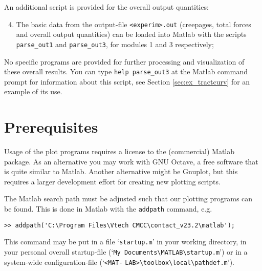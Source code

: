 \documentclass[12pt]{report}
\begin{document}
An additional script is provided for the overall output quantities:
\begin{enumerate}\setcounter{enumi}{3}
\item The basic data from the output-file {\tt <experim>.out} (creepages,
        total forces and overall output quantities) can be loaded into
        Matlab with the scripts {\tt parse\_out1} and {\tt parse\_out3},
        for modules 1 and 3 respectively;
\end{enumerate}
No specific programs are provided for further processing and visualization
of these overall results. You can type {\tt help parse\_out3} at the Matlab
command prompt for information about this script, see Section
\ref{sec:ex_tractcurv} for an example of its use.

\section{Prerequisites}

Usage of the plot programs requires a license to the (commercial) Matlab
package. As an alternative you may work with GNU Octave, a free software
that is quite similar to Matlab. Another alternative might be Gnuplot, but
this requires a larger development effort for creating new plotting
scripts.

The Matlab search path must be adjusted such that our plotting programs can
be found. This is done in Matlab with the {\tt addpath} command, e.g.
\begin{verbatim}
>> addpath('C:\Program Files\Vtech CMCC\contact_v23.2\matlab');
\end{verbatim}
This command may be put in a file `{\tt startup.m}' in your working
directory, in your personal overall startup-file
(`\verb+My Documents\MATLAB\startup.m+') or in a system-wide
configuration-file (`\verb+<MAT-+ \verb+LAB>\toolbox\local\pathdef.m+').
\end{document}
